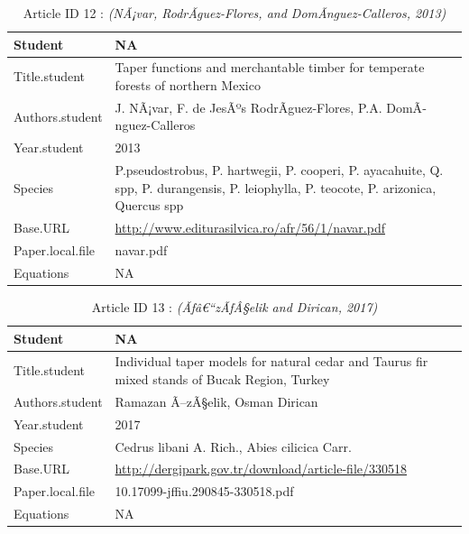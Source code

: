\documentclass[]{article}
\begin{document}
\begin{table}
\caption{
Article ID 12 : \textit{(NÃ¡var, RodrÃ­guez-Flores, and DomÃ­nguez-Calleros, 2013)}\\
}
\begin{tabular}{p{} p{}}
\hline
Student & NA \\ \hline
Title.student & Taper functions and merchantable timber for temperate forests of northern Mexico \\ \hline
Authors.student & J. NÃ¡var, F. de JesÃºs RodrÃ­guez-Flores, P.A. DomÃ­nguez-Calleros \\ \hline
Year.student & 2013 \\ \hline
Species & P.pseudostrobus, P. hartwegii, P. cooperi, P. ayacahuite, Q. spp, P. durangensis, P. leiophylla, P. teocote, P. arizonica, Quercus spp \\ \hline
Base.URL & \url{http://www.editurasilvica.ro/afr/56/1/navar.pdf} \\ \hline
Paper.local.file & navar.pdf \\ \hline
Equations & NA \\ \hline
\end{tabular}\end{table}

\begin{table}
\caption{
Article ID 13 : \textit{(Ãƒâ€“zÃƒÂ§elik and Dirican, 2017)}\\
}
\begin{tabular}{p{} p{}}
\hline
Student & NA \\ \hline
Title.student & Individual taper models for natural cedar and Taurus fir mixed stands of Bucak Region, Turkey \\ \hline
Authors.student & Ramazan Ã–zÃ§elik, Osman Dirican \\ \hline
Year.student & 2017 \\ \hline
Species & Cedrus libani A. Rich., Abies cilicica Carr. \\ \hline
Base.URL & \url{http://dergipark.gov.tr/download/article-file/330518} \\ \hline
Paper.local.file & 10.17099-jffiu.290845-330518.pdf \\ \hline
Equations & NA \\ \hline
\end{tabular}\end{table}
\end{document}
